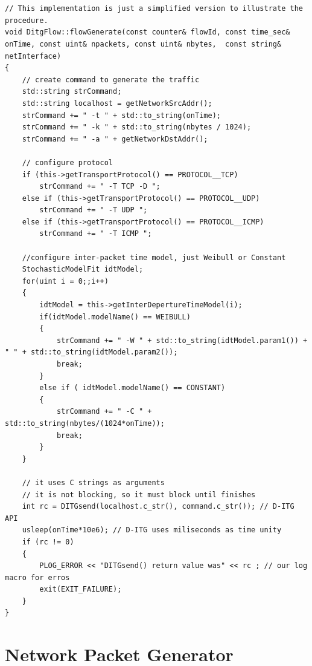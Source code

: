 \begin{verbatim}


// This implementation is just a simplified version to illustrate the procedure.
void DitgFlow::flowGenerate(const counter& flowId, const time_sec& onTime, const uint& npackets, const uint& nbytes,  const string& netInterface)
{
    // create command to generate the traffic
    std::string strCommand;
    std::string localhost = getNetworkSrcAddr(); 
    strCommand += " -t " + std::to_string(onTime); 
    strCommand += " -k " + std::to_string(nbytes / 1024);
    strCommand += " -a " + getNetworkDstAddr();
    
    // configure protocol
    if (this->getTransportProtocol() == PROTOCOL__TCP)
        strCommand += " -T TCP -D ";
    else if (this->getTransportProtocol() == PROTOCOL__UDP)
        strCommand += " -T UDP ";
    else if (this->getTransportProtocol() == PROTOCOL__ICMP)
        strCommand += " -T ICMP ";
        
    //configure inter-packet time model, just Weibull or Constant
    StochasticModelFit idtModel;
    for(uint i = 0;;i++)
    {    
        idtModel = this->getInterDepertureTimeModel(i);
        if(idtModel.modelName() == WEIBULL)
        {
            strCommand += " -W " + std::to_string(idtModel.param1()) + " " + std::to_string(idtModel.param2());
            break;
        }
        else if ( idtModel.modelName() == CONSTANT)
        {
            strCommand += " -C " + std::to_string(nbytes/(1024*onTime));
            break;
        }
    }
    
    // it uses C strings as arguments
    // it is not blocking, so it must block until finishes
    int rc = DITGsend(localhost.c_str(), command.c_str()); // D-ITG API
    usleep(onTime*10e6); // D-ITG uses miliseconds as time unity
    if (rc != 0)
    {
        PLOG_ERROR << "DITGsend() return value was" << rc ; // our log macro for erros
        exit(EXIT_FAILURE);
    }
}
\end{verbatim}


\section{Network Packet Generator}


